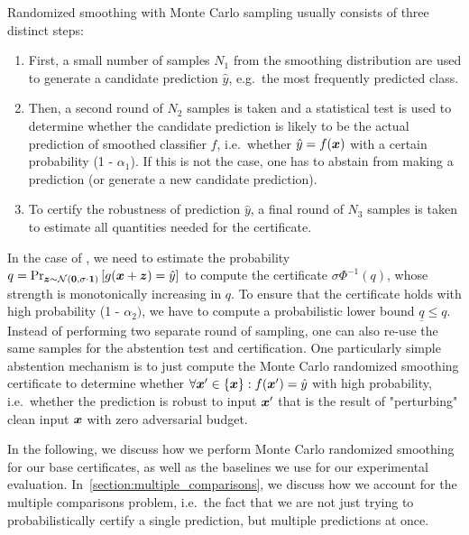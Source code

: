 Randomized smoothing with Monte Carlo sampling usually consists of three distinct steps:
\begin{enumerate}%
    \item{
    First, a small number of samples $N_1$ from the smoothing distribution are used to generate a candidate prediction $\hat{y}$, e.g.~the most frequently predicted class.
    }
    \item{
    Then, a second round of $N_2$ samples is taken and a statistical test is used to determine whether the candidate prediction is likely to be the actual prediction of smoothed classifier $f$, i.e.~whether $\hat{y} = f({\bm{x}})$ with a certain probability (1 - $\alpha_1$). If this is not the case, one has to abstain from making a prediction (or generate a new candidate prediction).
    }
    \item{
    To certify the robustness of prediction $\hat{y}$, a final round of $N_3$ samples is taken to estimate all quantities needed for the certificate.}
\end{enumerate}
In the case of \citep{Cohen2019}, we need to estimate the probability $q = \Pr_{{\bm{z}} \sim \mathcal{N}(\mathbf{0}, \sigma \cdot \bm{1})}\left[g({\bm{x}} + {\bm{z}}) = \hat{y}\right]$ to compute the certificate $\sigma \Phi^{-1}(q)$, whose strength is monotonically increasing in $q$. To ensure that the certificate holds with high probability (1 - $\alpha_2)$, we have to compute a probabilistic lower bound $\underline{q} \leq q$.
Instead of performing two separate round of sampling, one can also re-use the same samples for the abstention test and certification.
One particularly simple abstention mechanism is to just compute the Monte Carlo randomized smoothing certificate to determine whether $\forall {\bm{x}}' \in \left\{{\bm{x}}\right\} : f({\bm{x}}') = \hat{y}$ with high probability, i.e.~whether the prediction is robust to input ${\bm{x}}'$ that is the result of "perturbing" clean input ${\bm{x}}$ with zero adversarial budget.

In the following, we discuss how we perform Monte Carlo randomized smoothing for our base certificates, as well as the baselines we use for our experimental evaluation.
In~\autoref{section:multiple_comparisons}, we discuss how we account for the multiple comparisons problem, i.e.~the fact that we are not just trying to probabilistically certify a single prediction, but multiple predictions at once.


